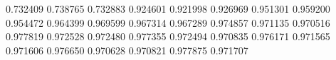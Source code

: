 0.732409
0.738765
0.732883
0.924601
0.921998
0.926969
0.951301
0.959200
0.954472
0.964399
0.969599
0.967314
0.967289
0.974857
0.971135
0.970516
0.977819
0.972528
0.972480
0.977355
0.972494
0.970835
0.976171
0.971565
0.971606
0.976650
0.970628
0.970821
0.977875
0.971707
